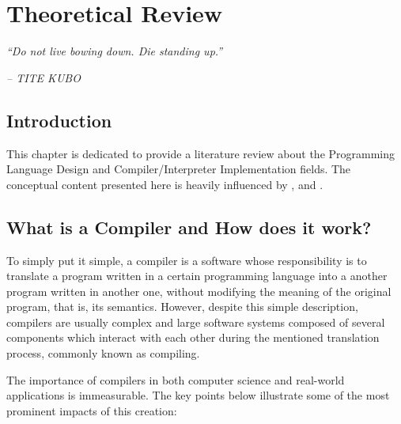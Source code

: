 \chapter{Theoretical Review} \label{Cap:theoretical_review}

\begin{displayquote}
    \begin{center}
        \textit{``Do not live bowing down. Die standing up.''}
    \end{center}
\end{displayquote}

\begin{flushright}
   \textit{-- TITE KUBO}
\end{flushright}

\section{Introduction}
This chapter is dedicated to provide a literature review about the Programming Language Design and Compiler/Interpreter Implementation fields. The conceptual content presented here is heavily influenced by \cite{aho1986compilers}, \cite{cooper2022engineering} and \cite{nystrom2021crafting}.

\section{What is a Compiler and How does it work?}
To simply put it simple, a compiler is a software whose responsibility is to translate a program written in a certain programming language into a another program written in another one, without modifying the meaning of the original program, that is, its semantics. However, despite this simple description, compilers are usually complex and large software systems composed of several components which interact with each other during the mentioned translation process, commonly known as compiling.

The importance of compilers in both computer science and real-world applications is immeasurable. The key points below illustrate some of the most prominent impacts of this creation:

